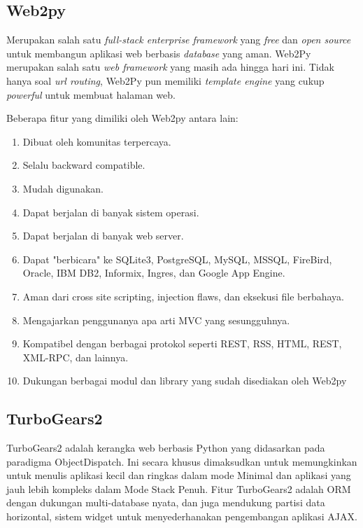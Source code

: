 \subsection{Web2py}

Merupakan salah satu \textit{full-stack enterprise framework} yang \textit{free} dan \textit{open source} untuk membangun aplikasi web berbasis \textit{database} yang aman. Web2Py merupakan salah satu \textit{web framework} yang masih ada hingga hari ini. Tidak hanya soal \textit{url routing}, Web2Py pun memiliki \textit{template engine} yang cukup \textit{powerful} untuk membuat halaman web. %

Beberapa fitur yang dimiliki oleh Web2py antara lain:
\begin{enumerate}
\item Dibuat oleh komunitas terpercaya.
\item Selalu backward compatible.
\item Mudah digunakan.
\item Dapat berjalan di banyak sistem operasi.
\item Dapat berjalan di banyak web server.
\item Dapat "berbicara" ke SQLite3, PostgreSQL, MySQL, MSSQL, FireBird, Oracle, IBM DB2, Informix, Ingres, dan Google App Engine.
\item Aman dari cross site scripting, injection flaws, dan eksekusi file berbahaya.
\item Mengajarkan penggunanya apa arti MVC yang sesungguhnya.
\item Kompatibel dengan berbagai protokol seperti REST, RSS, HTML, REST, XML-RPC, dan lainnya.
\item Dukungan berbagai modul dan library yang sudah disediakan oleh Web2py
\end{enumerate}

\subsection{TurboGears2}

TurboGears2 adalah kerangka web berbasis Python yang didasarkan pada paradigma ObjectDispatch. Ini secara khusus dimaksudkan untuk memungkinkan untuk menulis aplikasi kecil dan ringkas dalam mode Minimal dan aplikasi yang jauh lebih kompleks dalam Mode Stack Penuh. Fitur TurboGears2 adalah ORM dengan dukungan multi-database nyata, dan juga mendukung partisi data horizontal, sistem widget untuk menyederhanakan pengembangan aplikasi AJAX.

